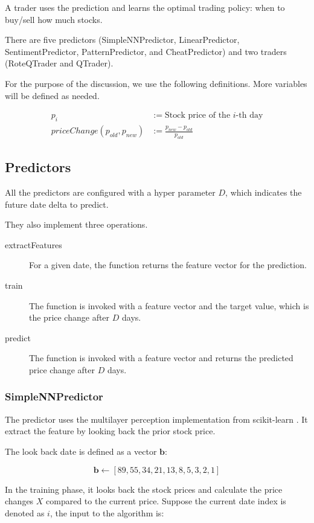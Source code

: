 \documentclass[twocolumn,10pt]{asme2ej}
\newcommand{\vect}[1]{\boldsymbol{#1}}
\begin{document}
A trader uses the prediction and learns the optimal trading policy:
when to buy/sell how much stocks.

There are five predictors (SimpleNNPredictor, LinearPredictor,
SentimentPredictor, PatternPredictor, and CheatPredictor) and two
traders (RoteQTrader and QTrader). 

For the purpose of the discussion, we use the following definitions. More
variables will be defined as needed.

\begin{align*}
p_i &:= \text{Stock price of the }i\text{-th day} \\
priceChange(p_{old}, p_{new}) &:= \frac{p_{new} - p_{old}}{p_{old}}
\end{align*}

\subsection{Predictors}

All the predictors are configured with a hyper parameter $D$, which indicates
the future date delta to predict. 

They also implement three operations.

\begin{description}
  \item[extractFeatures] For a given date, the function returns the feature
    vector for the prediction.
  \item[train] The function is invoked with a feature vector and the target
    value, which is the price change after $D$ days.
  \item[predict] The function is invoked with a feature vector and returns the
    predicted price change after $D$ days.
\end{description}

\subsubsection{SimpleNNPredictor}
The predictor uses the multilayer perception implementation from
scikit-learn \cite{web:scikit_learn}. It extract the feature by
looking back the prior stock price.

The look back date is defined as a vector $\vect{b}$:

\[
\vect{b} \gets [89, 55, 34, 21, 13, 8, 5, 3, 2, 1]
\]

In the training phase, it looks back the stock prices and calculate
the price changes $X$ compared to the current price. Suppose the
current date index is denoted as $i$, the input to the algorithm is:
\end{document}
